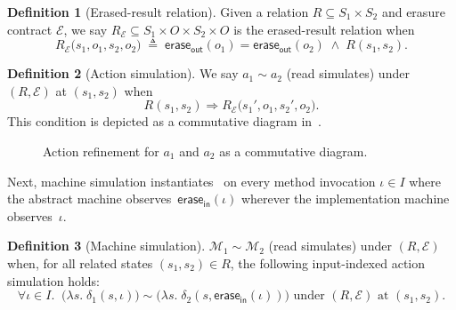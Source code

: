 \documentclass[fontset=fira-newtxsf]{mitthesis}
\theoremstyle{definition}
\newtheorem{definition}{Definition}[section]
\theoremstyle{plain}
\begin{document}
\begin{definition}[Erased-result relation] \label{def:erased-relation}
Given a relation $R \subseteq S_1 \times S_2$ and erasure contract $\mathcal{E}$, we say $R_\mathcal{E} \subseteq S_1 \times O \times S_2 \times O$ is the erased-result relation when
\[
  R_\mathcal{E}\bigl(s_1,o_1,s_2,o_2\bigr)
  \;\triangleq\;
  \mathsf{erase_{out}}(o_1)=\mathsf{erase_{out}}(o_2) \; \land \; R(s_1,s_2).
\]
\end{definition}

\begin{definition}[Action simulation] \label{def:action-refinement}
We say $a_1 \sim a_2$ (read simulates) under \((R,\mathcal{E})\) at \((s_1,s_2)\) when
\[
  R(s_1,s_2) \Rightarrow R_\mathcal{E}\bigl(s_1',o_1,s_2',o_2\bigr).
\]
This condition is depicted as a commutative diagram in~.
\end{definition}

\begin{figure}[H]
\centering
{}
\caption[Action refinement]{Action refinement for \(a_1\) and \(a_2\) as a commutative diagram.}
\label{fig:sim-action-square}
\end{figure}

Next, machine simulation instantiates~ on every method invocation $\iota \in I$ where the abstract machine observes~\(\mathsf{erase_{in}}(\iota)\) wherever the implementation machine observes~\(\iota\).

\begin{definition}[Machine simulation] \label{def:machine-refinement}
$\mathcal{M}_1 \sim \mathcal{M}_2$ (read simulates) under $(R, \mathcal{E})$ when, for all related states $(s_1,s_2)\in R$, the following input-indexed action simulation holds:
\[
  \forall \iota \in I.\;\;
  \bigl(\lambda s.\; \delta_1(s,\iota)\bigr)
  \sim
  \bigl(\lambda s.\; \delta_2(s,\mathsf{erase_{in}}(\iota))\bigr)
  \text{ under } (R,\mathcal{E})
  \text{ at } (s_1,s_2)
.\]
\end{definition}
\end{document}
